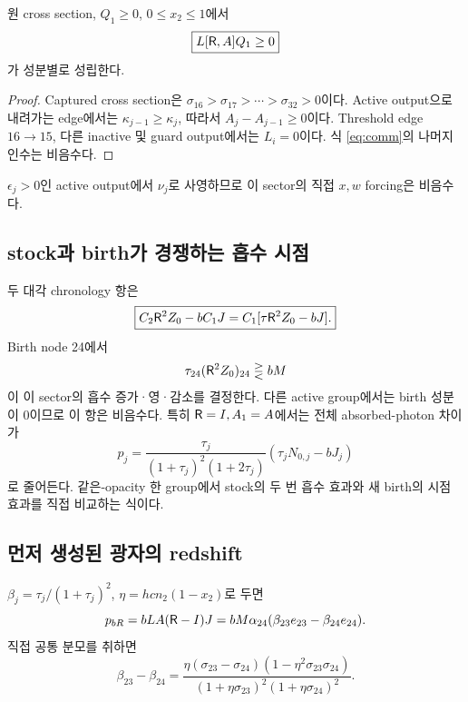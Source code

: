 \begin{proposition}[흡수--수송 순서의 부호]\label{prop:comm}
원 cross section, $Q_1\ge0$, $0\le x_2\le1$에서
\begin{equation}
\boxed{L[\mathsf R,A]Q_1\ge0}
\label{eq:commsign}
\end{equation}
가 성분별로 성립한다.
\end{proposition}
\begin{proof}
Captured cross section은 $\sigma_{16}>\sigma_{17}>\cdots>\sigma_{32}>0$이다. Active output으로 내려가는 edge에서는 $\kappa_{j-1}\ge\kappa_j$, 따라서 $A_j-A_{j-1}\ge0$이다. Threshold edge $16\to15$, 다른 inactive 및 guard output에서는 $L_i=0$이다. 식 \eqref{eq:comm}의 나머지 인수는 비음수다.
\end{proof}
$\epsilon_j>0$인 active output에서 $\nu_j$로 사영하므로 이 sector의 직접 $x,w$ forcing은 비음수다.

\subsection{stock과 birth가 경쟁하는 흡수 시점}
두 대각 chronology 항은
\begin{equation}
\boxed{C_2\mathsf R^2Z_0-bC_1J=C_1[\tau\mathsf R^2Z_0-bJ].}
\label{eq:balance}
\end{equation}
Birth node 24에서
\[
\tau_{24}(\mathsf R^2Z_0)_{24}\gtreqless bM
\]
이 이 sector의 흡수 증가·영·감소를 결정한다. 다른 active group에서는 birth 성분이 0이므로 이 항은 비음수다. 특히 $\mathsf R=I,A_1=A$에서는 전체 absorbed-photon 차이가
\begin{equation}
p_j=
\frac{\tau_j}{(1+\tau_j)^2(1+2\tau_j)}
(\tau_jN_{0,j}-bJ_j)
\label{eq:scalarbalance}
\end{equation}
로 줄어든다. 같은-opacity 한 group에서 stock의 두 번 흡수 효과와 새 birth의 시점 효과를 직접 비교하는 식이다.

\subsection{먼저 생성된 광자의 redshift}
$\beta_j=\tau_j/(1+\tau_j)^2$, $\eta=hcn_2(1-x_2)$로 두면
\begin{equation}
p_{bR}=bLA(\mathsf R-I)J
=bM\alpha_{24}(\beta_{23}e_{23}-\beta_{24}e_{24}).
\label{eq:birthred}
\end{equation}
직접 공통 분모를 취하면
\begin{equation}
\beta_{23}-\beta_{24}
=\frac{\eta(\sigma_{23}-\sigma_{24})(1-\eta^2\sigma_{23}\sigma_{24})}
{(1+\eta\sigma_{23})^2(1+\eta\sigma_{24})^2}.
\label{eq:betadiff}
\end{equation}

